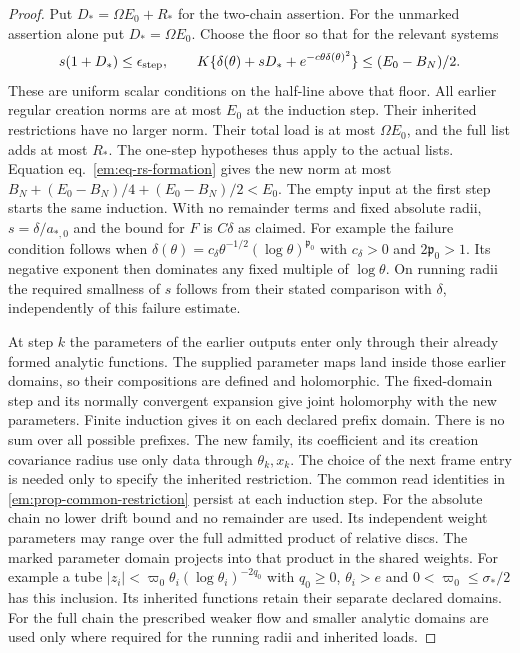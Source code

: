 \documentclass[11pt,letterpaper,reqno]{amsart}
\numberwithin{equation}{section}
\renewcommand{\eqref}[1]{\textup{eq.~\ref{#1}}}
\theoremstyle{definition}
\theoremstyle{remark}
\begin{document}
\begin{proof}
Put $D_* =\Omega E_0+R_*$ for the two-chain assertion.
For the unmarked assertion alone put $D_*=\Omega E_0$.
Choose the floor so that for the relevant
systems
\[
    s(1+D_*)\le\epsilon_{\rm step},\qquad
    K\{\delta(\theta)+sD_*+e^{-c\theta\delta(\theta)^2}\}
                               \le (E_0-B_N)/2 .
\]
These are uniform scalar conditions on the half-line above that floor.
All earlier regular creation norms are at most $E_0$ at the induction
step. Their inherited restrictions have no larger norm. Their total
load is at most $\Omega E_0$, and the full list adds at most
$R_*$. The one-step hypotheses thus apply to the actual lists.
Equation \eqref{em:eq-rs-formation} gives the new norm at most
$B_N+(E_0-B_N)/4+(E_0-B_N)/2<E_0$. The empty input at the first step
starts the same induction. With no remainder terms and fixed absolute
radii, $s=\delta/a_{*,0}$ and the bound for $F$ is $C\delta$ as claimed.
For example the failure condition follows when
$\delta(\theta)=c_\delta\theta^{-1/2}(\log\theta)^{\mathfrak p_0}$
with $c_\delta>0$ and $2\mathfrak p_0>1$. Its negative exponent then
dominates any fixed multiple of $\log\theta$. On running radii the
required smallness of $s$ follows from their stated comparison with
$\delta$, independently of this failure estimate.

At step $k$ the parameters of the earlier outputs enter only through
their already formed analytic functions. The supplied parameter maps
land inside those earlier domains, so their compositions are defined
and holomorphic. The fixed-domain step and
its normally convergent expansion give joint holomorphy with the new
parameters. Finite induction gives it on each declared prefix domain.
There is no sum over all possible prefixes. The new family, its
coefficient and its creation covariance radius use only data through
$\theta_k,x_k$. The choice of the next frame entry is needed only to
specify the inherited restriction. The common read identities in
\cref{em:prop-common-restriction} persist at each induction step. For
the absolute chain no lower drift bound and no remainder are used.
Its independent weight parameters may range over the full admitted
product of relative discs. The marked parameter domain projects into
that product in the shared weights. For example a tube
$|z_i|<\varpi_0\theta_i(\log\theta_i)^{-2q_0}$ with
$q_0\ge0$, $\theta_i>e$ and $0<\varpi_0\le\sigma_*/2$ has this
inclusion. Its inherited functions retain their separate declared
domains. For the full chain the prescribed weaker
flow and smaller analytic domains are used only where required for
the running radii and inherited loads.
\end{proof}
\end{document}
